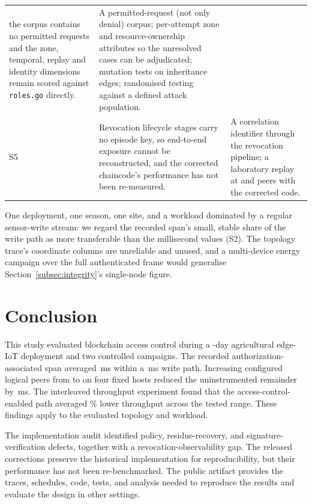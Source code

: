 \documentclass[a4paper,fleqn]{cas-dc}
\begin{document}
\begin{table}[pos=t]
\begin{tabularx}{\columnwidth}{@{}p{}Xp{}@{}}
     the corpus contains no permitted requests and the zone, temporal,
     replay and identity dimensions remain scored against
     \texttt{roles.go} directly. &
     A permitted-request (not only denial) corpus; per-attempt zone and
     resource-ownership attributes so the unresolved cases can be
     adjudicated; mutation tests on inheritance edges; randomised testing
     against a defined attack population. \\
S5 & Revocation lifecycle stages carry no episode key, so end-to-end
     exposure cannot be reconstructed, and the corrected chaincode's
     performance has not been re-measured. &
     A correlation identifier through the revocation pipeline; a
     laboratory replay at \ScaleMinPeers{} and \ScaleMaxPeers{} peers with
     the corrected code. \\
\bottomrule
\end{tabularx}
\end{table}

One deployment, one season, one site, and a workload dominated by a
regular sensor-write stream: we regard the recorded span's small, stable
share of the write path as more transferable than the millisecond values
(S2). The topology trace's coordinate columns are unreliable and unused,
and a multi-device energy campaign over the full authenticated frame would
generalise Section~\ref{subsec:integrity}'s single-node figure.

\FloatBarrier
\section{Conclusion}
\label{sec:conclusion}

This study evaluated blockchain access control during a \DeployDays-day
agricultural edge-IoT deployment and two controlled campaigns. The recorded
authorization-associated span averaged \PartAccess\,ms within a
\PartTotal\,ms write path. Increasing configured logical peers from
\ScaleMinPeers{} to \ScaleMaxPeers{} on four fixed hosts reduced the
uninstrumented remainder by \PartEndorser\,ms. The interleaved throughput
experiment found that the access-control-enabled path averaged
\OverheadMeanPct\% lower throughput across the tested range. These findings
apply to the evaluated topology and workload.

The implementation audit identified policy, residue-recovery, and
signature-verification defects, together with a revocation-observability
gap. The released corrections preserve the historical implementation for
reproducibility, but their performance has not been re-benchmarked. The
public artifact provides the traces, schedules, code, tests, and analysis
needed to reproduce the results and evaluate the design in other settings.
\end{document}

